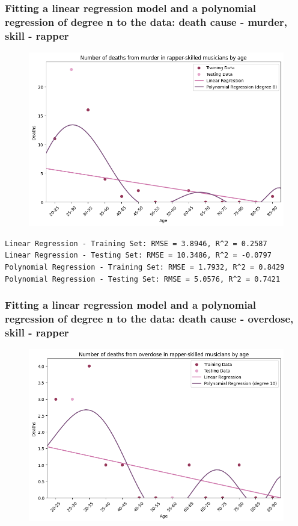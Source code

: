 \documentclass{article}
\begin{document}
\subsubsection{Fitting a linear regression model and a polynomial regression of degree n to the data: death cause - murder, skill - rapper}

\begin{figure} [H]
    \centering
    \includegraphics[width=0.6\linewidth]{graph_images/experiments/exp5.png}
    \label{fig:enter-label}
\end{figure}

\noindent\texttt{Linear Regression - Training Set: RMSE = 3.8946, R\textasciicircum2 = 0.2587\\
Linear Regression - Testing Set: RMSE = 10.3486, R\textasciicircum2 = -0.0797\\
Polynomial Regression - Training Set: RMSE = 1.7932, R\textasciicircum2 = 0.8429\\
Polynomial Regression - Testing Set: RMSE = 5.0576, R\textasciicircum2 = 0.7421\\}



\subsubsection{Fitting a linear regression model and a polynomial regression of degree n to the data: death cause - overdose, skill - rapper}

\begin{figure} [H]
    \centering
    \includegraphics[width=0.6\linewidth]{graph_images/experiments/exp6.png}
    \label{fig:enter-label}
\end{figure}
\end{document}
